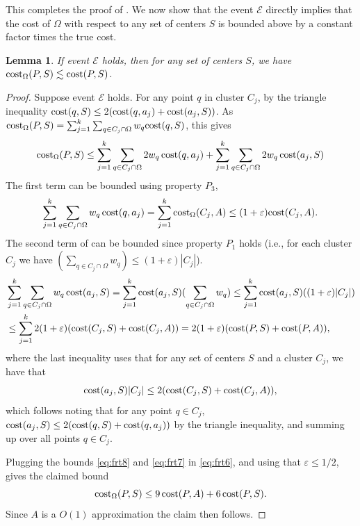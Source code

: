 \documentclass[11pt]{article}
\newtheorem{lemma}{Lemma}[section]
\theoremstyle{restate}
\theoremstyle{definition}
\newcommand{\eps}{\ensuremath{\varepsilon}}
\newcommand{\cost}{\textnormal{cost}}
\newcommand{\costom}{\cost_\Omega} %
\begin{document}
This completes the proof of . We now show that the event $\mathcal{E}$ directly implies that the cost of $\Omega$ with respect to any set of centers $S$ is bounded above by a constant factor times the true cost. 

\begin{lemma}
    If event $\mathcal{E}$ holds, then for any set of centers $S$, we have $\costom(P,S) \lesssim \cost(P,S)$.
\end{lemma}
\begin{proof} 
Suppose event $\mathcal{E}$ holds. For any point $q$ in cluster $C_j$, by the triangle inequality $\cost(q,S) \leq 2(\cost(q, a_j) + \cost(a_j, S))$. As  $\costom(P,S) = \sum_{j=1}^k \sum_{q \in C_j \cap \Omega} w_q \cost(q,S)$, this gives
    \begin{align}
     \costom(P,S) 
    \leq \sum_{j=1}^k \sum_{q \in C_j \cap \Omega} 2w_q\,\cost(q,a_j) + \sum_{j=1}^k\sum_{q \in C_j \cap \Omega}2w_q\,\cost(a_j,S) 
    \label{eq:frt6}
      \end{align}
     The first term can be bounded using property $P_3$,
\begin{equation} 
\sum_{j=1}^k \sum_{q \in C_j \cap \Omega} w_q\,\cost(q,a_j) = \sum_{j=1}^k \costom(C_j,A) \leq (1+\eps) \cost(C_j,A).
\label{eq:frt8}
\end{equation}
The second term of  can be bounded since property $P_1$ holds (i.e., for each cluster $C_j$ we have 
 $(\sum_{q \in C_j \cap \Omega} w_q) \leq(1+\eps) |C_j|$).
\begin{align} & \sum_{j=1}^k\sum_{q \in C_j \cap \Omega} w_q\,\cost(a_j,S) = \sum_{j=1}^k \cost(a_j,S) (\sum_{q \in C_j \cap \Omega} w_q) \leq \sum_{j=1}^k \cost(a_j,S) ((1+\eps)|C_j|) \notag \\
& \leq \sum_{j=1}^k 2 (1+\eps) (\cost(C_j,S) + \cost(C_j,A)) = 2(1+\eps)(\cost(P,S) + \cost(P,A)),
\label{eq:frt7}
\end{align}
where the last inequality uses that for any set of centers $S$ and a cluster $C_j$, we have that
\begin{equation*}
\cost(a_j, S) |C_j|\leq 2(\cost(C_j, S) + \cost(C_j,A)),
\end{equation*}
which follows noting that for any point $q\in C_j$, $ \cost(a_j,S)\leq 2(\cost(q,S) + \cost(q,a_j))$ by the triangle inequality, and summing up over all points $q\in C_j$.

Plugging the bounds \eqref{eq:frt8}
 and \eqref{eq:frt7} in \eqref{eq:frt6}, and using that $\eps\leq 1/2$, gives the claimed bound  
 \[ \costom(P,S) \leq 9 \,\cost(P,A) + 6\, \cost(P,S).   \]
 Since $A$ is a $O(1)$ approximation the claim then follows. \qedhere
\end{proof}
\end{document}
